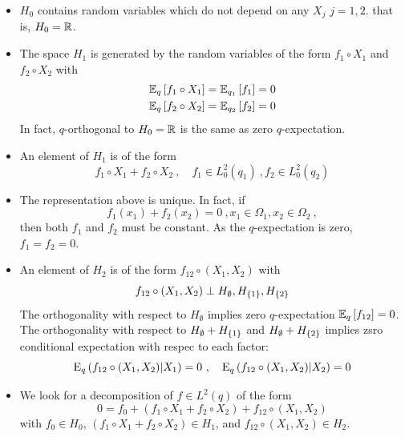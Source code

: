 \documentclass[xcolor=svgnames]{beamer}
\begin{document}
\begin{frame}
\begin{itemize}
\begin{itemize}
      \end{itemize}
    \item $H_0$ contains random variables which do not depend on any $X_j$ $j=1,2$. that is, $H_0 = \mathbb{R}$.
    \item The space $H_1$ is generated by the random variables of the form 
        $f_1\circ X_1$ and $f_2\circ X_2$
    with 
    \begin{gather*}
        \operatorname{\mathbb E}_{q}\left[f_1\circ X_1\right] = \operatorname{\mathbb E}_{q_1}\left[f_1\right] = 0 \\
           \operatorname{\mathbb E}_{q}\left[f_2\circ X_2\right] = \operatorname{\mathbb E}_{q_2}\left[f_2\right] = 0 
    \end{gather*}
   In fact, $q$-orthogonal to $H_0 = \mathbb{R}$ is the same as zero $q$-expectation.
   \item An element of $H_1$ is of the form
   \begin{equation*}
       f_1\circ X_1 + f_2 \circ X_2 \ , \quad f_1 \in L^2_0(q_1) \ , f_2 \in L^2_0(q_2)
   \end{equation*}
   \item The representation above is unique. In fact, if
   \begin{equation*}
       f_1(x_1) + f_2(x_2) = 0 \ , x_1 \in \Omega_1, x_2 \in \Omega_2 \ ,
   \end{equation*}
   then both $f_1$ and $f_2$ must be constant. As the $q$-expectation is zero, $f_1 = f_2 = 0$.
   \item An element of $H_2$ is of the form $f_{12} \circ(X_1,X_2)$ with
   \begin{equation*}
     f_{12} \circ(X_1,X_2) \perp H_{\emptyset}, H_{\left\{1\right\}}, H_{\left\{2\right\}}  
   \end{equation*}
   The orthogonality with respect to $H_{\emptyset}$ implies zero $q$-expectation $\operatorname{\mathbb E}_{q}\left[f_{12}\right] = 0$. The orthogonality with respect to $H_{\emptyset} + H_{\left\{1\right\}}$ and $H_{\emptyset} + H_{\left\{2\right\}}$ implies zsro conditional expectation with respec to each factor:
   \begin{equation*}
       \operatorname{E}_{q}\left(f_{12} \circ (X_1,X_2) \middle| X_1\right) = 0 \ , \quad \operatorname{E}_{q}\left(f_{12} \circ (X_1,X_2) \middle| X_2\right) = 0
   \end{equation*}
    \item We look for a decomposition of $f \in L^2(q)$ of the form
    \begin{equation*}
    0 = f_0 + (f_1\circ X_1 + f_2\circ X_2) + f_{12}\circ (X_1,X_2)
    \end{equation*}
    with $f_0 \in H_0$, $(f_1\circ X_1 + f_2\circ X_2) \in H_1$, and $f_{12}\circ (X_1,X_2) \in H_2$. 

\end{itemize}
\end{frame}
\end{document}
